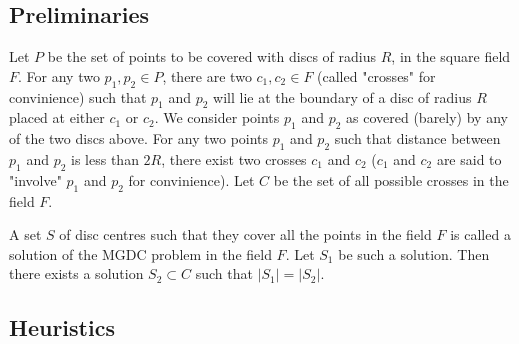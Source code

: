 \subsection{Preliminaries}
\label{subsec:prelim}

Let $P$ be the set of points to be covered with discs of radius $R$, in the square field $F$. For any two $p_1, p_2 \in P$, there are two $c_1,c_2 \in F$ (called "crosses" for convinience) such that $p_1$ and $p_2$ will lie at the boundary of a disc of radius $R$ placed at either $c_1$ or $c_2$. We consider points $p_1$ and $p_2$ as covered (barely) by any of the two discs above. For any two points $p_1$ and $p_2$ such that distance between $p_1$ and $p_2$ is less than $2R$, there exist two crosses $c_1$ and $c_2$ ($c_1$ and $c_2$ are said to "involve" $p_1$ and $p_2$ for convinience). Let $C$ be the set of all possible crosses in the field $F$.

A set $S$ of disc centres such that they cover all the points in the field $F$ is called a solution of the MGDC problem in the field $F$. Let $S_1$ be such a solution. Then there exists a solution $S_2 \subset C$ such that $|S_1|=|S_2|$.

\subsection{Heuristics}


